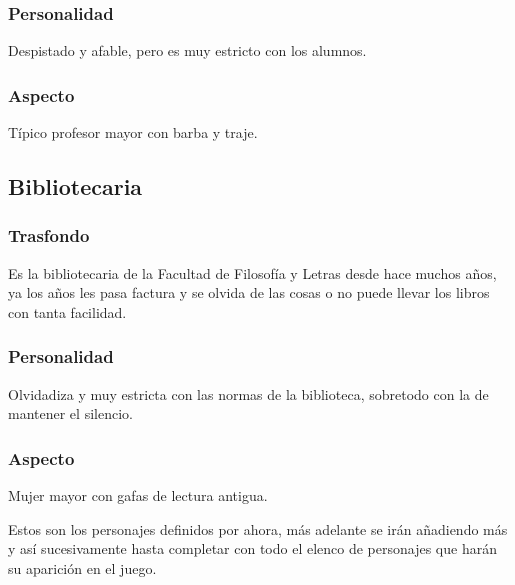             \subsubsection{Personalidad}
            Despistado y afable, pero es muy estricto con los alumnos.
            \subsubsection{Aspecto}
            Típico profesor mayor con barba y traje.
            
        \subsection{Bibliotecaria}
            \subsubsection{Trasfondo}
            Es la bibliotecaria de la Facultad de Filosofía y Letras desde hace muchos años, ya los años les pasa factura y se olvida de las cosas o no puede llevar los libros con tanta facilidad.
            \subsubsection{Personalidad}
            Olvidadiza y muy estricta con las normas de la biblioteca, sobretodo con la de mantener el silencio.
            \subsubsection{Aspecto}
            Mujer mayor con gafas de lectura antigua.
    
    Estos son los personajes definidos por ahora, más adelante se irán añadiendo más y así sucesivamente hasta completar con todo el elenco de personajes que harán su aparición en el juego.
